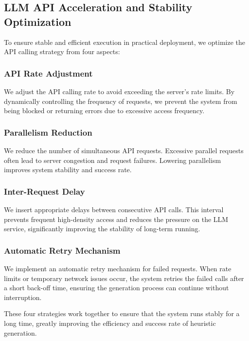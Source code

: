 \documentclass{article}
\begin{document}
\subsection{LLM API Acceleration and Stability Optimization}

To ensure stable and efficient execution in practical deployment, we optimize the API calling strategy from four aspects:

\subsubsection{API Rate Adjustment}

We adjust the API calling rate to avoid exceeding the server's rate limits. By dynamically controlling the frequency of requests, we prevent the system from being blocked or returning errors due to excessive access frequency.

\subsubsection{Parallelism Reduction}

We reduce the number of simultaneous API requests. Excessive parallel requests often lead to server congestion and request failures. Lowering parallelism improves system stability and success rate.

\subsubsection{Inter-Request Delay}

We insert appropriate delays between consecutive API calls. This interval prevents frequent high-density access and reduces the pressure on the LLM service, significantly improving the stability of long-term running.

\subsubsection{Automatic Retry Mechanism}

We implement an automatic retry mechanism for failed requests. When rate limits or temporary network issues occur, the system retries the failed calls after a short back-off time, ensuring the generation process can continue without interruption.

These four strategies work together to ensure that the system runs stably for a long time, greatly improving the efficiency and success rate of heuristic generation.
\end{document}
